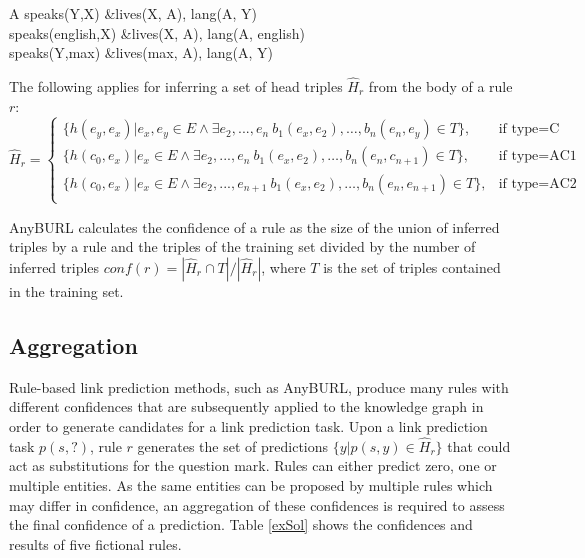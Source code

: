 \documentclass[akbc,twoside,11pt,lettersize]{article}
\begin{document}
\begin{table}[h]
\centering
\begin{tabular}{A}
\hline
	speaks(Y,X) &\leftarrow lives(X, A), lang(A, Y) \\
	speaks(english,X) &\leftarrow lives(X, A), lang(A, english) \\
	speaks(Y,max) &\leftarrow lives(max, A), lang(A, Y) \\ \hline
\end{tabular}
\caption{Rules that can be generalized from the ground path $speaks(max, english) \leftarrow lives(max, uk), lang(uk, english)$}
\label{rulesexm}
\end{table}

The following applies for inferring a set of head triples $\hat{H}_r$ from the body of a rule $r$:
\[
    \hat{H}_r= 
\begin{cases}
    \{h(e_y,e_x) |  e_x,e_y \in E \land \exists e_2, ..., e_n \ b_1(e_x, e_2), \dots, b_n(e_n, e_y)  \in T \},& \text{if type} = \text{C}\\
    \{h(c_0,e_x) | e_x \in E \land \exists e_2, ..., e_n \ b_1(e_x, e_2), \dots, b_n(e_n, c_{n+1})   \in T \}, & \text{if type} = \text{AC1}\\
    \{h(c_0,e_x) | e_x \in E \land \exists e_2, ..., e_{n+1} \ b_1(e_x, e_2), \dots, b_n(e_n, e_{n+1})   \in T \}, & \text{if type} = \text{AC2}\\
\end{cases}
\]

AnyBURL calculates the confidence of a rule as the size of the union of inferred triples by a rule and the triples of the training set divided by the number of inferred triples $conf(r) = |\hat{H}_r \cap T|/|\hat{H}_r|$, where $T$ is the set of triples contained in the training set.












\subsection{Aggregation}

Rule-based link prediction methods, such as AnyBURL, produce many rules with different confidences that are subsequently applied to the knowledge graph in order to generate candidates for a link prediction task. Upon a link prediction task $p(s,?)$, rule $r$ generates the set of predictions $\{y | p(s, y) \in \hat{H}_r\}$ that could act as substitutions for the question mark. Rules can either predict zero, one or multiple entities. As the same entities can be proposed by multiple rules which may differ in confidence, an aggregation of these confidences is required to assess the final confidence of a prediction. Table \ref{exSol} shows the confidences and results of five fictional rules.
\end{document}
